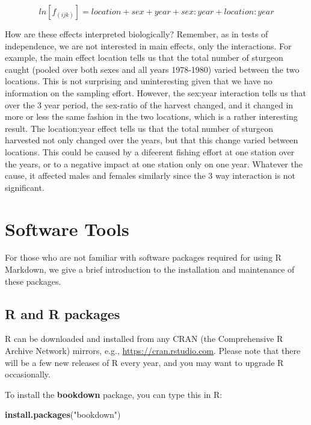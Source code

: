 \documentclass[
  12pt,
]{book}
\newenvironment{Shaded}{\begin{snugshade}}{\end{snugshade}}
\newcommand{\KeywordTok}[1]{\textcolor[rgb]{0.13,0.29,0.53}{\textbf{#1}}}
\newcommand{\NormalTok}[1]{#1}
\newcommand{\StringTok}[1]{\textcolor[rgb]{0.31,0.60,0.02}{#1}}
\begin{document}
\[ln[f_{(ijk)} ] = location + sex + year + sex:year + location:year\]

How are these effects interpreted biologically? Remember, as in tests of independence, we are not interested in main effects, only the interactions. For example, the main effect location tells us that the total number of sturgeon caught (pooled over both sexes and all years 1978-1980) varied between the two locations. This is not surprising and uninteresting given that we have no information on the sampling effort. However, the sex:year interaction tells us that over the 3 year period, the sex-ratio of the harvest changed, and it changed in more or less the same fashion in the two locations, which is a rather interesting result. The location:year effect tells us that the total number of sturgeon harvested not only changed over the years, but that this change varied between locations. This could be caused by a difeerent fishing effort at one station over the years, or to a negative impact at one station only on one year. Whatever the cause, it affected males and females similarly since the 3 way interaction is not significant.

\cleardoublepage

\hypertarget{appendix-appendix}{%
\appendix {}}


\hypertarget{software-tools}{%
\chapter{Software Tools}\label{software-tools}}

For those who are not familiar with software packages required for using R Markdown, we give a brief introduction to the installation and maintenance of these packages.

\hypertarget{r-and-r-packages}{%
\section{R and R packages}\label{r-and-r-packages}}

R can be downloaded and installed from any CRAN (the Comprehensive R Archive Network) mirrors, e.g., \url{https://cran.rstudio.com}. Please note that there will be a few new releases of R every year, and you may want to upgrade R occasionally.

To install the \textbf{bookdown} package, you can type this in R:

\begin{Shaded}
\begin{Highlighting}[]
\KeywordTok{install.packages}\NormalTok{(}\StringTok{"bookdown"}\NormalTok{)}
\end{Highlighting}
\end{Shaded}
\end{document}
